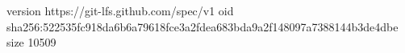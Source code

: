version https://git-lfs.github.com/spec/v1
oid sha256:522535fc918da6b6a79618fce3a2fdea683bda9a2f148097a7388144b3de4dbe
size 10509
